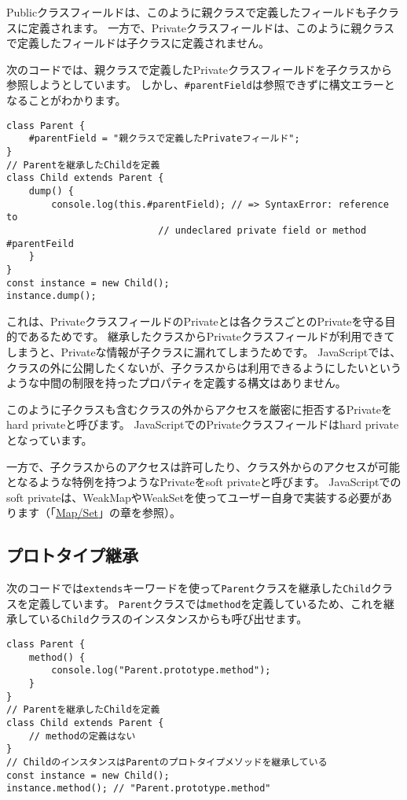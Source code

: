 Publicクラスフィールドは、このように親クラスで定義したフィールドも子クラスに定義されます。
一方で、Privateクラスフィールドは、このように親クラスで定義したフィールドは子クラスに定義されません。

次のコードでは、親クラスで定義したPrivateクラスフィールドを子クラスから参照しようとしています。
しかし、\texttt{\#parentField}は参照できずに構文エラーとなることがわかります。

\begin{lstlisting}
class Parent {
    #parentField = "親クラスで定義したPrivateフィールド";
}
// Parentを継承したChildを定義
class Child extends Parent {
    dump() {
        console.log(this.#parentField); // => SyntaxError: reference to 
                           // undeclared private field or method #parentFeild
    }
}
const instance = new Child();
instance.dump();
\end{lstlisting}

これは、PrivateクラスフィールドのPrivateとは各クラスごとのPrivateを守る目的であるためです。
継承したクラスからPrivateクラスフィールドが利用できてしまうと、Privateな情報が子クラスに漏れてしまうためです。
JavaScriptでは、クラスの外に公開したくないが、子クラスからは利用できるようにしたいというような中間の制限を持ったプロパティを定義する構文はありません。

このように子クラスも含むクラスの外からアクセスを厳密に拒否するPrivateをhard privateと呼びます。
JavaScriptでのPrivateクラスフィールドはhard privateとなっています。

一方で、子クラスからのアクセスは許可したり、クラス外からのアクセスが可能となるような特例を持つようなPrivateをsoft privateと呼びます。
JavaScriptでのsoft privateは、WeakMapやWeakSetを使ってユーザー自身で実装する必要があります（「\hyperlink{map-and-set}{Map/Set}」の章を参照）。

\hypertarget{prototype-inheritance}{%
\subsection{プロトタイプ継承}\label{prototype-inheritance}}

次のコードでは\texttt{extends}キーワードを使って\texttt{Parent}クラスを継承した\texttt{Child}クラスを定義しています。
\texttt{Parent}クラスでは\texttt{method}を定義しているため、これを継承している\texttt{Child}クラスのインスタンスからも呼び出せます。

\begin{lstlisting}
class Parent {
    method() {
        console.log("Parent.prototype.method");
    }
}
// Parentを継承したChildを定義
class Child extends Parent {
    // methodの定義はない
}
// ChildのインスタンスはParentのプロトタイプメソッドを継承している
const instance = new Child();
instance.method(); // "Parent.prototype.method"
\end{lstlisting}

